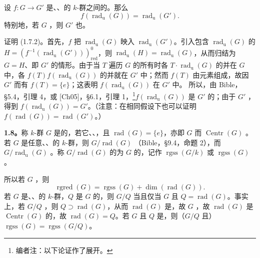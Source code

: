 设 $f:G\to G'$ 是、、的 $k$-群之间的。那么
\begin{equation}
f(\operatorname{rad}_{\mathrm u}(G))=\operatorname{rad}_{\mathrm u}(G').\tag{1.7.2}
\end{equation}
特别地，若 $G$ ，则 $G'$ 也。

证明 (1.7.2)。首先，$f$ 把 $\operatorname{rad}_{\mathrm u}(G)$ 映入 $\operatorname{rad}_{\mathrm u}(G')$。引入包含 $\operatorname{rad}_{\mathrm u}(G)$ 的 $H=(f^{-1}(\operatorname{rad}_{\mathrm u}(G')))^0_{\mathrm{red}}$，则 $\operatorname{rad}_{\mathrm u}(H)=\operatorname{rad}_{\mathrm u}(G)$，从而归结为 $G=H$、即 $G'$ 的情形。由于当 $T$ 遍历 $G$ 的所有时各 $T\cdot\operatorname{rad}_{\mathrm u}(G)$ 的并在 $G$ 中，各 $f(T)f(\operatorname{rad}_{\mathrm u}(G))$ 的并就在 $G'$ 中；然而 $f(T)$ 由元素组成，故因 $G'$ 而有 $f(T)=\{e\}$；这表明 $f(\operatorname{rad}_{\mathrm u}(G))$ 在 $G'$ 中。
所以，由 Bible，\S 5.4，引理 4，或 [Ch05]，\S 6.1，引理 1，\footnote[8]{编者注：以下论证作了展开。}$f(\operatorname{rad}_{\mathrm u}(G))$ 是 $G'$ 的；由于 $G'$ ，得到 $f(\operatorname{rad}_{\mathrm u}(G))=G'$。（注意：在相同假设下也可以证明 $f(\operatorname{rad}(G))=\operatorname{rad}(G')$。）

\textbf{1.8。}称 $k$-群 $G$ 是的，若它、、，且 $\operatorname{rad}(G)=\{e\}$，亦即 $G$ 而 $\operatorname{Centr}(G)$ 。若 $G$ 是任意、、的 $k$-群，则 $G/\operatorname{rad}(G)$ （Bible，\S 9.4，命题 2），而 $G/\operatorname{rad}_{\mathrm u}(G)$ 。称 $G/\operatorname{rad}(G)$ 的为 $G$ 的，记作 $\operatorname{rgss}(G/k)$ 或 $\operatorname{rgss}(G)$。

所以若 $G$ ，则
\[
\operatorname{rgred}(G)=\operatorname{rgss}(G)+\dim(\operatorname{rad}(G)).
\]
若 $G$ 是、、的 $k$-群，$Q$ 是 $G$ 的，则 $G/Q$ 当且仅当 $G$ 且 $Q=\operatorname{rad}(G)$。事实上，若 $G/Q$ ，则 $Q\supset\operatorname{rad}(G)$，从而 $\operatorname{rad}(G)$ 是，故 $G$ ，故 $\operatorname{rad}(G)$ 是 $\operatorname{Centr}(G)$ 的，故 $\operatorname{rad}(G)=Q$。若 $G$ 且 $Q$ 是，则（$G/Q$ 且）$\operatorname{rgss}(G)=\operatorname{rgss}(G/Q)$。

